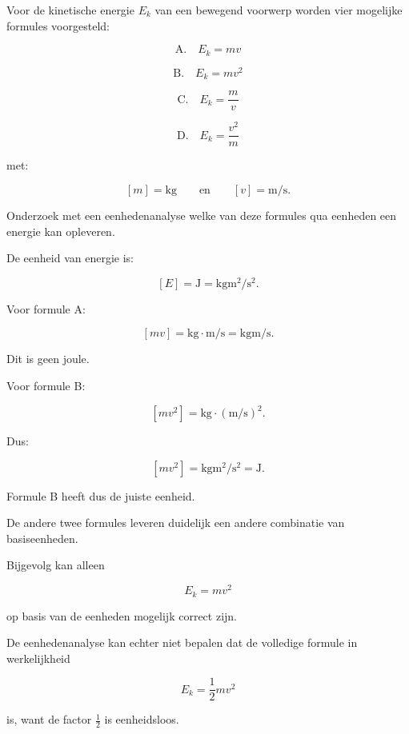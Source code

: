 \documentclass{ximera}
\begin{document}
\begin{oefening}{\oefU}

Voor de kinetische energie $E_k$ van een bewegend voorwerp worden vier mogelijke formules voorgesteld:

\[
\text{A.}\quad E_k = mv
\]

\[
\text{B.}\quad E_k = mv^2
\]

\[
\text{C.}\quad E_k = \frac{m}{v}
\]

\[
\text{D.}\quad E_k = \frac{v^2}{m}
\]

met:

\[
[m] = \si{\kilogram}
\qquad\text{en}\qquad
[v] = \si{\meter\per\second}.
\]

\begin{question}
Onderzoek met een eenhedenanalyse welke van deze formules qua eenheden een energie kan opleveren.

\begin{oplossing}
De eenheid van energie is:

\[
[E]
=
\si{\joule}
=
\si{\kilogram\meter\squared\per\second\squared}.
\]

Voor formule A:

\[
[mv]
=
\si{\kilogram}
\cdot
\si{\meter\per\second}
=
\si{\kilogram\meter\per\second}.
\]

Dit is geen joule.

Voor formule B:

\[
[mv^2]
=
\si{\kilogram}
\cdot
\left(
\si{\meter\per\second}
\right)^2.
\]

Dus:

\[
[mv^2]
=
\si{\kilogram\meter\squared\per\second\squared}
=
\si{\joule}.
\]

Formule B heeft dus de juiste eenheid.

De andere twee formules leveren duidelijk een andere combinatie van basiseenheden.

Bijgevolg kan alleen

\[
\boxed{
E_k = mv^2
}
\]

op basis van de eenheden mogelijk correct zijn.

De eenhedenanalyse kan echter niet bepalen dat de volledige formule in werkelijkheid

\[
E_k = \frac{1}{2}mv^2
\]

is, want de factor $\frac{1}{2}$ is eenheidsloos.
\end{oplossing}
\end{question}

\end{oefening}
\end{document}
